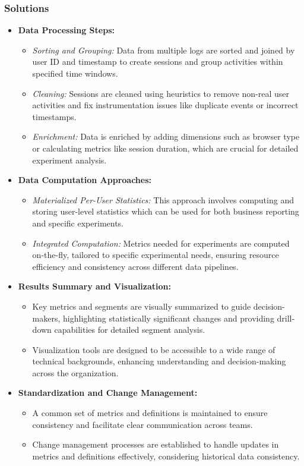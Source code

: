 \documentclass{article}
\begin{document}
\subsubsection*{Solutions}
\begin{itemize}
    \item \textbf{Data Processing Steps:}
    \begin{itemize}
        \item \textit{Sorting and Grouping:} Data from multiple logs are sorted and joined by user ID and timestamp to create sessions and group activities within specified time windows.
        \item \textit{Cleaning:} Sessions are cleaned using heuristics to remove non-real user activities and fix instrumentation issues like duplicate events or incorrect timestamps.
        \item \textit{Enrichment:} Data is enriched by adding dimensions such as browser type or calculating metrics like session duration, which are crucial for detailed experiment analysis.
    \end{itemize}

    \item \textbf{Data Computation Approaches:}
    \begin{itemize}
        \item \textit{Materialized Per-User Statistics:} This approach involves computing and storing user-level statistics which can be used for both business reporting and specific experiments.
        \item \textit{Integrated Computation:} Metrics needed for experiments are computed on-the-fly, tailored to specific experimental needs, ensuring resource efficiency and consistency across different data pipelines.
    \end{itemize}

    \item \textbf{Results Summary and Visualization:}
    \begin{itemize}
        \item Key metrics and segments are visually summarized to guide decision-makers, highlighting statistically significant changes and providing drill-down capabilities for detailed segment analysis.
        \item Visualization tools are designed to be accessible to a wide range of technical backgrounds, enhancing understanding and decision-making across the organization.
    \end{itemize}

    \item \textbf{Standardization and Change Management:}
    \begin{itemize}
        \item A common set of metrics and definitions is maintained to ensure consistency and facilitate clear communication across teams.
        \item Change management processes are established to handle updates in metrics and definitions effectively, considering historical data consistency.
    \end{itemize}
\end{itemize}
\end{document}
